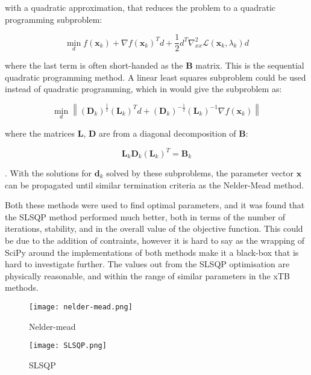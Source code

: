 with a quadratic approximation, that reduces the problem to a quadratic programming
subproblem:

\begin{equation}
\min_d f\left(\mathbf{x}_k\right) + \nabla f\left(\mathbf{x}_k\right)^T d + \frac{1}{2}d^T \nabla^2_{xx} \mathcal{L} \left(\mathbf{x}_k, \lambda_k \right) d
\end{equation}

where the last term is often short-handed as the $\mathbf{B}$ matrix. This is the 
sequential quadratic programming method. A linear least squares subproblem could
be used instead of quadratic programming, which in would give the subproblem as:

\begin{equation}
\min_d \left\| \left(\mathbf{D}_k\right)^{\frac{1}{2}} \left(\mathbf{L}_k\right)^T d + \left(\mathbf{D}_k\right)^{-\frac{1}{2}}\left(\mathbf{L}_k\right)^{-1}\nabla f \left(\mathbf{x}_k\right)\right\|
\end{equation}

where the matrices $\mathbf{L}$, $\mathbf{D}$ are from a diagonal decomposition 
of $\mathbf{B}$:

\begin{equation}
\mathbf{L}_k \mathbf{D}_k \left(\mathbf{L}_k\right)^T = \mathbf{B}_k
\end{equation}

. With the solutions for $\mathbf{d}_k$ solved by these subproblems, the parameter vector
$\mathbf{x}$ can be propagated until similar termination criteria as the Nelder-Mead
method.

Both these methods were used to find optimal parameters, and it was found that
the SLSQP method performed much better, both in terms of the number of iterations,
stability, and in the overall value of the objective function. This could be due 
to the addition of contraints, however it is hard to say as the wrapping of SciPy
around the implementations of both methods make it a black-box that is hard to 
investigate further. The values out from the SLSQP optimisation are physically
reasonable, and within the range of similar parameters in the xTB methods.

\begin{figure}
    \texttt{[image: nelder-mead.png]}
    \caption{Nelder-mead}
    \label{fig:nelder_mead}
\end{figure}

\begin{figure}
    \texttt{[image: SLSQP.png]}
    \caption{SLSQP}
    \label{fig:slsqp}
\end{figure}

